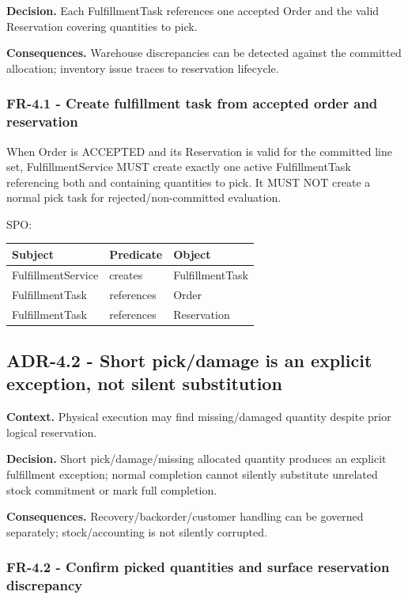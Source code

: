 \documentclass[
  10pt,
]{article}
\begin{document}
\textbf{Decision.} Each FulfillmentTask references one accepted Order
and the valid Reservation covering quantities to pick.

\textbf{Consequences.} Warehouse discrepancies can be detected against
the committed allocation; inventory issue traces to reservation
lifecycle.

\subsubsection{FR-4.1 - Create fulfillment task from accepted order and
reservation}\label{fr-41---create-fulfillment-task-from-accepted-order-and-reservation}

When Order is ACCEPTED and its Reservation is valid for the committed
line set, FulfillmentService MUST create exactly one active
FulfillmentTask referencing both and containing quantities to pick. It
MUST NOT create a normal pick task for rejected/non-committed
evaluation.

SPO:

\begin{longtable}[]{@{}lll@{}}
\toprule\noalign{}
Subject & Predicate & Object \\
\midrule\noalign{}
\endhead
\bottomrule\noalign{}
\endlastfoot
FulfillmentService & creates & FulfillmentTask \\
FulfillmentTask & references & Order \\
FulfillmentTask & references & Reservation \\
\end{longtable}

\subsection{ADR-4.2 - Short pick/damage is an explicit exception, not
silent
substitution}\label{adr-42---short-pickdamage-is-an-explicit-exception-not-silent-substitution}

\textbf{Context.} Physical execution may find missing/damaged quantity
despite prior logical reservation.

\textbf{Decision.} Short pick/damage/missing allocated quantity produces
an explicit fulfillment exception; normal completion cannot silently
substitute unrelated stock commitment or mark full completion.

\textbf{Consequences.} Recovery/backorder/customer handling can be
governed separately; stock/accounting is not silently corrupted.

\subsubsection{FR-4.2 - Confirm picked quantities and surface
reservation
discrepancy}\label{fr-42---confirm-picked-quantities-and-surface-reservation-discrepancy}
\end{document}
